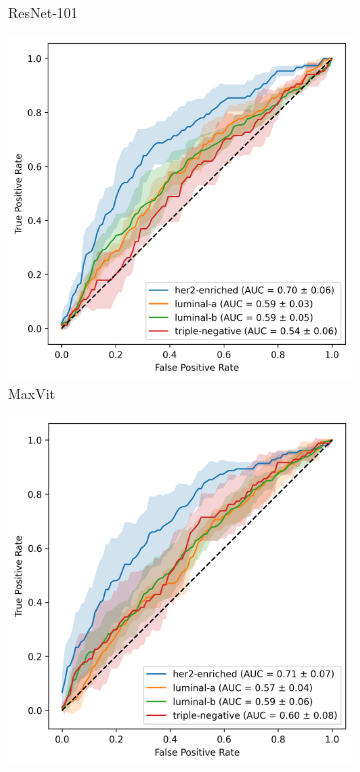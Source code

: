 \documentclass[a4paper,10pt]{book}
\begin{document}
\begin{figure}[h!]
\begin{subfigure}[t]{0.48\textwidth}
        \caption{ResNet-101}
        \label{fig:mean_auc_resnet}
    \end{subfigure}
    \vspace{0.5cm}
    \begin{subfigure}[t]{0.48\textwidth}
        \centering
        \includegraphics[width=\textwidth]{reports/assets/MEAN_AUC_MaxVit.png}
        \caption{MaxVit}
        \label{fig:mean_auc_maxvit}
    \end{subfigure}
    \begin{subfigure}[t]{0.48\textwidth}
        \centering
        \includegraphics[width=\textwidth]{reports/assets/MEAN_AUC_Swin.png}

\end{subfigure}
\end{figure}
\end{document}

